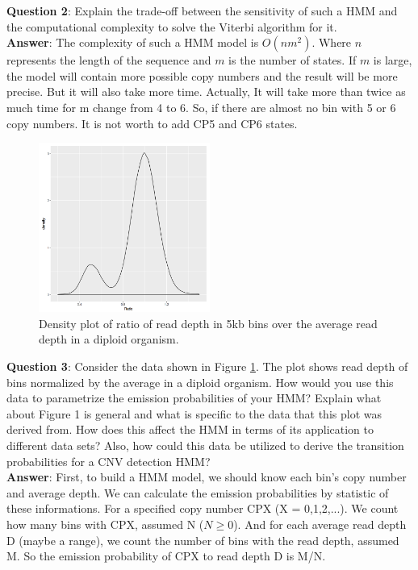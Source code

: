 \documentclass[a4paper]{article}
\begin{document}
\noindent\textbf{Question 2}: Explain the trade-off between the sensitivity of such a HMM and the computational complexity to solve the Viterbi algorithm for it.\\

\noindent\textbf{Answer}: The complexity of such a HMM model is $O(nm^2)$. Where $n$ represents the length of the sequence and $m$ is the number of states. If $m$ is large, the model will contain more possible copy numbers and the result will be more precise. But it will also take more time. Actually, It will take more than twice as much time for m change from 4 to 6. So, if there are almost no bin with 5 or 6 copy numbers. It is not worth to add CP5 and CP6 states.\\

\begin{figure}[h]
	\centering
	\includegraphics[width=0.5\textwidth]{fg1}
	\caption{Density plot of ratio of read depth in 5kb bins over the average read depth in a diploid organism.}
	\label{fig1} 
\end{figure}

\noindent\textbf{Question 3}: Consider the data shown in Figure \ref{fig1}. The plot shows read depth of bins normalized by the average in a diploid organism. How would you use this data to parametrize the emission probabilities of your HMM? Explain what about Figure 1 is general and what is specific to the data that this plot was derived from. How does this affect the HMM in terms of its application to different data sets? Also, how could this data be utilized to derive the transition probabilities for a CNV detection HMM?\\

\noindent\textbf{Answer}: First, to build a HMM model, we should know each bin's copy number and average depth. We can calculate the emission probabilities by statistic of these informations. For a specified copy number CPX (X = 0,1,2,...). We count how many bins with CPX, assumed N ($N\geq0$). And for each average read depth D (maybe a range), we count the number of bins with the read depth, assumed M. So the emission probability of CPX to read depth D is M/N. 
\end{document}
